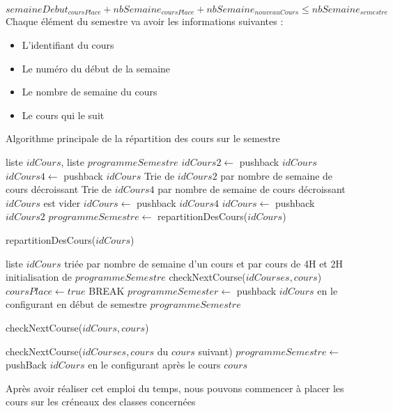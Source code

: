 \documentclass[12pt,a4paper,french]{article}
\begin{document}
$semaineDebut_{coursPlace} + nbSemaine_{coursPlace} + nbSemaine_{nouveauCours} \leq nbSemaine_{semestre}$\\

Chaque élément du semestre va avoir les informations suivantes :
\begin{itemize}
\item L'identifiant du cours
\item Le numéro du début de la semaine
\item Le nombre de semaine du cours
\item Le cours qui le suit
\end{itemize}

\begin{algorithm}
\caption{Algorithme principale de la répartition des cours sur le semestre}
\begin{algorithmic}
\REQUIRE liste $idCours$, liste $programmeSemestre$
\STATE $idCours2 \leftarrow$ pushback $idCours$
\ELSE
\STATE $idCours4 \leftarrow$ pushback $idCours$
\ENDIF
\ENDFOR
\STATE Trie de $idCours2$ par nombre de semaine de cours décroissant
\STATE Trie de $idCours4$ par nombre de semaine de cours décroissant
\STATE $idCours$ est vider
\STATE $idCours \leftarrow$ pushback $idCours4$
\ENDFOR
{}
\STATE $idCours \leftarrow$ pushback $idCours2$
\ENDFOR
\RETURN $programmeSemestre \leftarrow$ repartitionDesCours($idCours$)
\end{algorithmic}
\end{algorithm}

\begin{algorithm}
\caption{repartitionDesCours($idCours$)}
\begin {algorithmic}
\REQUIRE liste $idCours$ triée par nombre de semaine d'un cours et par cours de 4H et 2H
\STATE initialisation de $programmeSemestre$
\STATE checkNextCourse($idCourses, cours$)
\STATE $coursPlace \leftarrow true$
\STATE BREAK
\ENDIF
\ENDIF
\ENDFOR
{}
\STATE $programmeSemester \leftarrow$ pushback $idCours$ en le configurant en début de semestre
\ENDIF
\ENDFOR
\RETURN $programmeSemestre$
\end{algorithmic}
\end{algorithm}


\newpage

\begin{algorithm}
\caption{checkNextCourse($idCours, cours$)}
\begin {algorithmic}
\STATE checkNextCourse($idCourses, cours$ du $cours$ suivant)
\STATE $programmeSemestre \leftarrow$ pushBack $idCours$ en le configurant après le cours $cours$
\ENDIF
\end{algorithmic}
\end{algorithm}

Après avoir réaliser cet emploi du temps, nous pouvons commencer à placer les cours sur les créneaux des classes concernées



\end{document}
